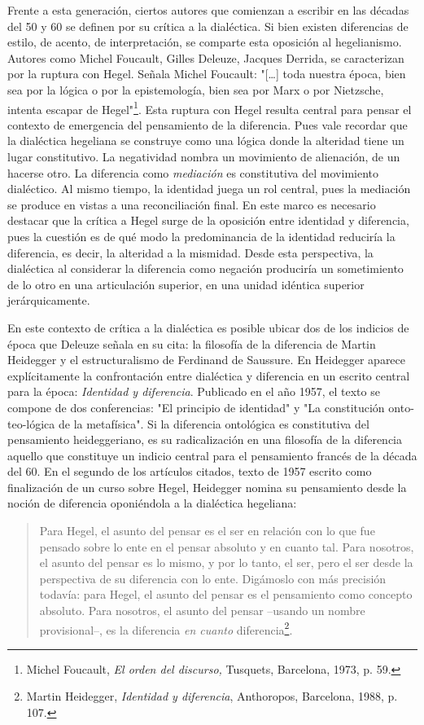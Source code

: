 \documentclass{book}
\begin{document}
Frente a esta generación, ciertos autores que comienzan a escribir en
las décadas del 50 y 60 se definen por su crítica a la dialéctica. Si
bien existen diferencias de estilo, de acento, de interpretación, se
comparte esta oposición al hegelianismo. Autores como Michel Foucault,
Gilles Deleuze, Jacques Derrida, se caracterizan por la ruptura con
Hegel. Señala Michel Foucault: "{[}\ldots{]} toda nuestra época, bien
sea por la lógica o por la epistemología, bien sea por Marx o por
Nietzsche, intenta escapar de Hegel"\footnote{Michel Foucault, \emph{El
  orden del discurso,} Tusquets, Barcelona, 1973, p. 59.}. Esta ruptura
con Hegel resulta central para pensar el contexto de emergencia del
pensamiento de la diferencia. Pues vale recordar que la dialéctica
hegeliana se construye como una lógica donde la alteridad tiene un lugar
constitutivo. La negatividad nombra un movimiento de alienación, de un
hacerse otro. La diferencia como \emph{mediación} es constitutiva del
movimiento dialéctico. Al mismo tiempo, la identidad juega un rol
central, pues la mediación se produce en vistas a una reconciliación
final. En este marco es necesario destacar que la crítica a Hegel surge
de la oposición entre identidad y diferencia, pues la cuestión es de qué
modo la predominancia de la identidad reduciría la diferencia, es decir,
la alteridad a la mismidad. Desde esta perspectiva, la dialéctica al
considerar la diferencia como negación produciría un sometimiento de lo
otro en una articulación superior, en una unidad idéntica superior
jerárquicamente.

En este contexto de crítica a la dialéctica es posible ubicar dos de los
indicios de época que Deleuze señala en su cita: la filosofía de la
diferencia de Martin Heidegger y el estructuralismo de Ferdinand de
Saussure. En Heidegger aparece explícitamente la confrontación entre
dialéctica y diferencia en un escrito central para la época:
\emph{Identidad y diferencia}. Publicado en el año 1957, el texto se
compone de dos conferencias: "El principio de identidad" y "La
constitución onto-teo-lógica de la metafísica". Si la diferencia
ontológica es constitutiva del pensamiento heideggeriano, es su
radicalización en una filosofía de la diferencia aquello que constituye
un indicio central para el pensamiento francés de la década del 60. En
el segundo de los artículos citados, texto de 1957 escrito como
finalización de un curso sobre Hegel, Heidegger nomina su pensamiento
desde la noción de diferencia oponiéndola a la dialéctica hegeliana:

\begin{quote}
Para Hegel, el asunto del pensar es el ser en relación con lo que fue
pensado sobre lo ente en el pensar absoluto y en cuanto tal. Para
nosotros, el asunto del pensar es lo mismo, y por lo tanto, el ser, pero
el ser desde la perspectiva de su diferencia con lo ente. Digámoslo con
más precisión todavía: para Hegel, el asunto del pensar es el
pensamiento como concepto absoluto. Para nosotros, el asunto del pensar
--usando un nombre provisional--, es la diferencia \emph{en cuanto}
diferencia\footnote{Martin Heidegger, \emph{Identidad y diferencia},
  Anthoropos, Barcelona, 1988, p. 107.}.
\end{quote}
\end{document}
